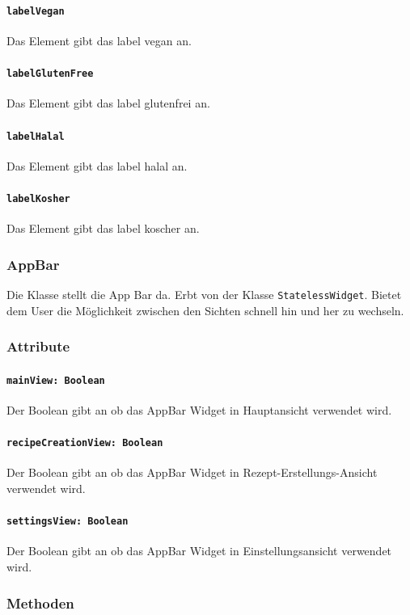\documentclass{entwurfsheft}
\begin{document}
            \paragraph*{\texttt{labelVegan}} Das Element gibt das \gls{label} vegan an.
            \paragraph*{\texttt{labelGlutenFree}} Das Element gibt das \gls{label} glutenfrei an.
            \paragraph*{\texttt{labelHalal}} Das Element gibt das \gls{label} halal an.
            \paragraph*{\texttt{labelKosher}} Das Element gibt das \gls{label} koscher an.

    \subsubsection{AppBar} \label{sec:AppBar}
        Die Klasse stellt die App Bar da. Erbt von der Klasse \texttt{StatelessWidget}. Bietet dem User die Möglichkeit zwischen den Sichten schnell hin und her zu wechseln.
        \subsubsection*{Attribute}
            \paragraph*{\texttt{mainView: Boolean}} Der Boolean gibt an ob das AppBar Widget in Hauptansicht verwendet wird.
            \paragraph*{\texttt{recipeCreationView: Boolean}} Der Boolean gibt an ob das AppBar Widget in Rezept-Erstellungs-Ansicht verwendet wird.
            \paragraph*{\texttt{settingsView: Boolean}} Der Boolean gibt an ob das AppBar Widget in Einstellungsansicht verwendet wird.
            
        \subsubsection*{Methoden}
\end{document}
